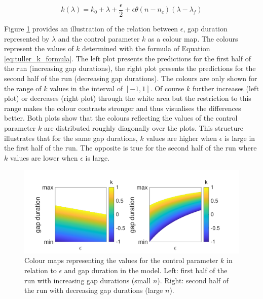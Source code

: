 \begin{equation}
k(\lambda) = k_0 + \lambda + \frac{\epsilon}{2} + \epsilon\theta(n-n_c)(\lambda-\lambda_f)
\label{eq:tuller_k_formula}
\end{equation}

Figure \ref{fig:tuller_colour_map} provides an illustration of the relation between $\epsilon$, gap duration represented by $\lambda$ and the control parameter $k$ as a colour map. The colours represent the values of $k$ determined with the formula of Equation \ref{eq:tuller_k_formula}. The left plot presents the predictions for the first half of the run (increasing gap durations), the right plot presents the predictions for the second half of the run (decreasing gap durations). The colours are only shown for the range of $k$ values in the interval of $[-1, 1]$. Of course $k$ further increases (left plot) or decreases (right plot) through the white area but the restriction to this range makes the colour contrasts stronger and thus visualises the differences better. Both plots show that the colours reflecting the values of the control parameter $k$ are distributed roughly diagonally over the plots. This structure illustrates that for the same gap durations, $k$ values are higher when $\epsilon$ is large in the first half of the run. The opposite is true for the second half of the run where $k$ values are lower when $\epsilon$ is large. 

\begin{figure}
\includegraphics[width=12cm]{figures/ch3/tuller_map.pdf}
\caption[Colour maps representing the values for the control parameter $k$ in relation to $\epsilon$ and gap duration in the \citet{Tulleretal1994} model.]{Colour maps representing the values for the control parameter $k$ in relation to $\epsilon$ and gap duration in the \citet{Tulleretal1994} model. Left: first half of the run with increasing gap durations (small $n$). Right: second half of the run with decreasing gap durations (large $n$).}
\label{fig:tuller_colour_map}
\end{figure}

